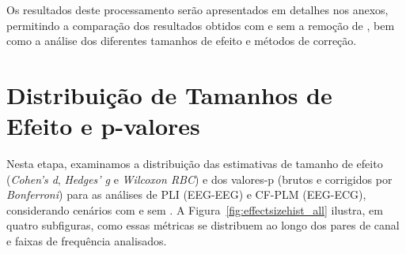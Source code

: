 Os resultados deste processamento serão apresentados em detalhes nos anexos, permitindo a comparação dos resultados obtidos com e sem a remoção de , bem como a análise dos diferentes tamanhos de efeito e métodos de correção.

\section{Distribuição de Tamanhos de Efeito e p-valores}
\label{sec:effect_size_distribution}
Nesta etapa, examinamos a distribuição das estimativas de tamanho de efeito (\textit{Cohen's d}, \textit{Hedges' g} e \textit{Wilcoxon RBC}) e dos valores-p (brutos e corrigidos por \textit{Bonferroni}) para as análises de PLI (EEG-EEG) e CF-PLM (EEG-ECG), considerando cenários com e sem . A Figura~\ref{fig:effectsizehist_all} ilustra, em quatro subfiguras, como essas métricas se distribuem ao longo dos pares de canal e faixas de frequência analisados.

